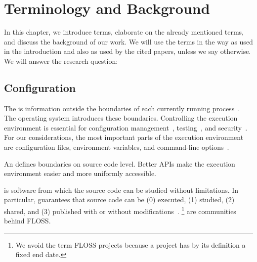 \chapter{Terminology and Background}
\label{chapter:background}


\chapterhung

In this chapter, we introduce terms, elaborate on the already mentioned terms, and discuss the background of our work.
We will use the terms in the way as used in the introduction and also as used by the cited papers, unless we say otherwise.
We will answer the research question:
\rqBackground*

\section{Configuration}

The  is information outside the boundaries of each currently running process~\cite{corbato1971multics}.
The operating system introduces these boundaries.
Controlling the execution environment is essential for configuration management~\cite{cons2002pan,huang2015confvalley}, testing~\cite{van2010automating,wang2009context}, and security~\cite{goldberg1996secure,schreuders2012towards,perkins2009automatically,liang2003isolated}.
For our considerations, the most important parts of the execution environment are configuration files, environment variables, and command-line options~\cite{raab2014program}.

An  defines boundaries on source code level.
Better APIs make the execution environment easier and more uniformly accessible.

is software from which the source code can be studied without limitations.
In particular,  guarantees that source code can be (0) executed, (1) studied, (2) shared, and (3) published with or without modifications~\cite{stallman2002free}.
\footnote{We avoid the term FLOSS projects because a project has by its definition a fixed end date.} are communities behind FLOSS.

